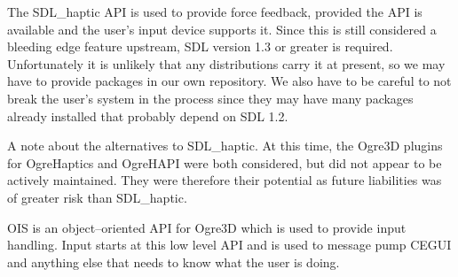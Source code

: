 

\startitemize[4]

The SDL_haptic API is used to provide force feedback, provided the API is available and the user's input device supports it. Since this is still considered a bleeding edge feature upstream, SDL version 1.3 or greater is required. Unfortunately it is unlikely that any distributions carry it at present, so we may have to provide packages in our own repository. We also have to be careful to not break the user's system in the process since they may have many packages already installed that probably depend on SDL 1.2.

A note about the alternatives to SDL_haptic. At this time, the Ogre3D plugins for OgreHaptics and OgreHAPI were both considered, but did not appear to be actively maintained. They were therefore their potential as future liabilities was of greater risk than SDL_haptic.


OIS is an object--oriented API for Ogre3D which is used to provide input handling. Input starts at this low level API and is used to message pump CEGUI and anything else that needs to know what the user is doing.
\stopitemize

